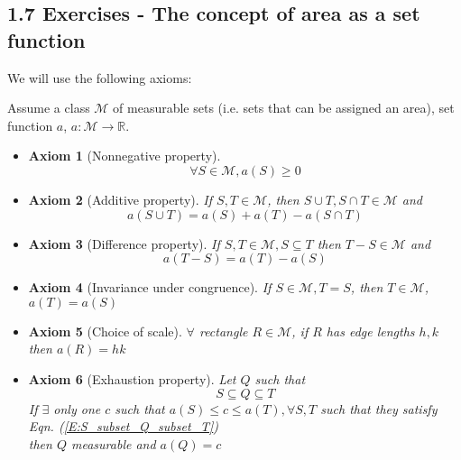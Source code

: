 \documentclass[twoside]{amsart}
\theoremstyle{plain}
\newtheorem{axiom}{Axiom}
\theoremstyle{definition}
\begin{document}
\subsection*{ 1.7 Exercises - The concept of area as a set function }
We will use the following axioms:

Assume a class $\mathcal{M}$ of measurable sets (i.e. sets that can be assigned an area), set function $a$, $a:\mathcal{M} \to \mathbb{R}$.  
\begin{itemize}
\item \begin{axiom}[Nonnegative property] \begin{equation}
    \forall S \in \mathcal{M}, a(S) \geq 0 \end{equation}   \end{axiom}
\item \begin{axiom}[Additive property]If $S,T \in \mathcal{M}$, then $S \cup T, S \cap T \in \mathcal{M}$ and 
  \begin{equation}
    a(S \cup T) = a(S) + a(T) - a(S \cap T)  
  \end{equation}
\end{axiom} 
\item \begin{axiom}[Difference property] If $S,T \in \mathcal{M}, S \subseteq T$ then $T-S \in \mathcal{M}$ and 
  \begin{equation}
    a(T-S) = a(T) -a(S)
  \end{equation}
\end{axiom}
\item \begin{axiom}[Invariance under congruence] 
  If $S \in \mathcal{M}, T=S$, then $T \in \mathcal{M}$, $a(T) = a(S)$
\end{axiom}
\item \begin{axiom}[Choice of scale]
$\forall$ rectangle $R \in \mathcal{M}$, if $R$ has edge lengths $h,k$ then $a(R) = hk$
\end{axiom}
\item \begin{axiom}[Exhaustion property]
  Let $Q$ such that 
  \begin{equation}\label{E:S_subset_Q_subset_T}
    S \subseteq Q \subseteq T 
  \end{equation}
If $\exists$ only one $c$ such that $a(S) \leq c \leq a(T), \forall S,T$ such that they satisfy Eqn. (\ref{E:S_subset_Q_subset_T})  \\
\phantom{If} then $Q$ measurable and $a(Q) = c$ 
\end{axiom}
\end{itemize}
\end{document}

